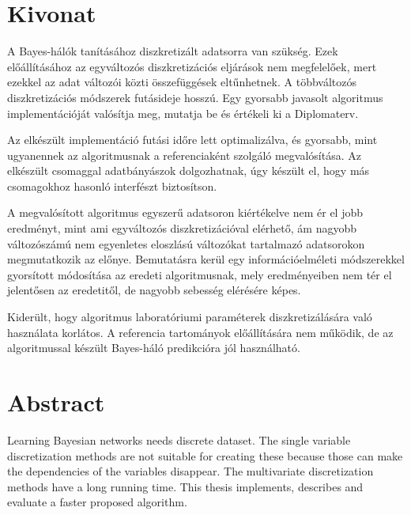 \setcounter{page}{1}


\chapter*{Kivonat}

A Bayes-hálók tanításához diszkretizált adatsorra van szükség. Ezek előállításához az egyváltozós diszkretizációs eljárások nem megfelelőek, mert ezekkel az adat változói közti összefüggések eltűnhetnek. A többváltozós diszkretizációs módszerek futásideje hosszú. Egy gyorsabb javasolt algoritmus implementációját valósítja meg, mutatja be és értékeli ki a Diplomaterv.

Az elkészült implementáció futási időre lett optimalizálva, és gyorsabb, mint ugyanennek az algoritmusnak a referenciaként szolgáló megvalósítása. Az elkészült csomaggal adatbányászok dolgozhatnak, úgy készült el, hogy más csomagokhoz hasonló interfészt biztosítson.

A megvalósított algoritmus egyszerű adatsoron kiértékelve nem ér el jobb eredményt, mint ami egyváltozós diszkretizációval elérhető, ám nagyobb változószámú nem egyenletes eloszlású változókat tartalmazó adatsorokon megmutatkozik az előnye. Bemutatásra kerül egy információelméleti módszerekkel gyorsított módosítása az eredeti algoritmusnak, mely eredményeiben nem tér el jelentősen az eredetitől, de nagyobb sebesség elérésére képes.

Kiderült, hogy algoritmus laboratóriumi paraméterek diszkretizálására való használata korlátos. A referencia tartományok előállítására nem működik, de az algoritmussal készült Bayes-háló predikcióra jól használható.

\vfill


\chapter*{Abstract}

Learning Bayesian networks needs discrete dataset. The single variable discretization methods are not suitable for creating these because those can make the dependencies of the variables disappear. The multivariate discretization methods have a long running time. This thesis implements, describes and evaluate a faster proposed algorithm.


